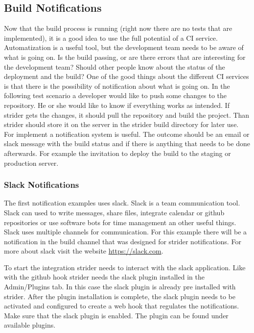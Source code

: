 \subsection{Build Notifications}
\label{section:Build Notifications}
Now that the build process is running (right now there are no tests that are implemented), it is a
good idea to use the full potential of a CI service. Automatization is a useful tool, but the development team needs to be aware of
what is going on. Is the build passing, or are there errors that are interesting for the development team? Should other people
know about the status of the deployment and the build? One of the good things about the different CI services is that there is the
possibility of notification about what is going on. In the following test scenario a developer would like to push some changes to the repository.
He or she would like to know if everything works as intended. If strider gets the changes, it should pull the repository and build the
project. Than strider should store it on the server in the strider build directory for later use. For implement a notification system is useful.
The outcome should be an email or slack message with the build status and if there is anything that needs to be done afterwards. For example
the invitation to deploy the build to the staging or production server.

\subsubsection{Slack Notifications}
The first notification examples uses slack. Slack is a team communication tool. Slack can used to write messages, share files, integrate calendar or
github repositories or use software bots for time management an other useful things. Slack uses multiple channels for communication. For this example there
will be a notification in the build channel that was designed for strider notifications. For more about slack visit the website \url{https://slack.com}.

To start the integration strider needs to interact with the slack application. Like with the github hook strider needs the slack
plugin installed in the Admin/Plugins tab. In this case the slack plugin is already pre installed with strider. After the plugin installation
is complete, the slack plugin needs to be activated and configured to create a web hook that regulates the notifications.
Make sure that the slack plugin is enabled. The plugin can be found under available plugins.

